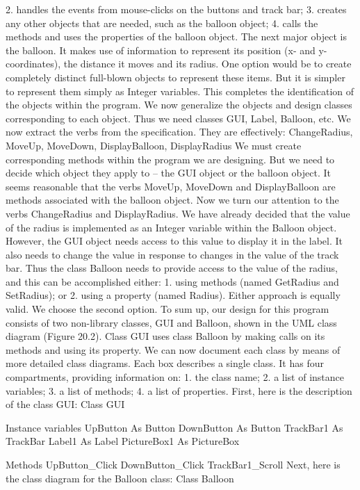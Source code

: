 2.	handles the events from mouse-clicks on the buttons and track bar;
3.	creates any other objects that are needed, such as the balloon object;
4.	calls the methods and uses the properties of the balloon object.
The next major object is the balloon. It makes use of information to represent its 
position (x- and y-coordinates), the distance it moves and its radius. One option would be to create completely distinct full-blown objects to represent these items. But it is simpler to represent them simply as Integer variables.
This completes the identiﬁcation of the objects within the program. We now generalize the objects and design classes corresponding to each object. Thus we need classes GUI, Label, Balloon, etc.
We now extract the verbs from the speciﬁcation. They are effectively:
ChangeRadius, MoveUp, MoveDown, DisplayBalloon, DisplayRadius
We must create corresponding methods within the program we are designing. But we need to decide which object they apply to – the GUI object or the balloon object. It seems reasonable that the verbs MoveUp, MoveDown and DisplayBalloon are methods associated with the balloon object.
Now we turn our attention to the verbs ChangeRadius and DisplayRadius. We have already decided that the value of the radius is implemented as an Integer variable within the Balloon object. However, the GUI object needs access to this value to display it in the label. It also needs to change the value in response to changes in the value of the track bar. Thus the class Balloon needs to provide access to the value of the radius, and this can be accomplished either:
1.	using methods (named GetRadius and SetRadius); or
2.	using a property (named Radius).
Either approach is equally valid. We choose the second option.
To sum up, our design for this program consists of two non-library classes, GUI and Balloon, shown in the UML class diagram (Figure 20.2). Class GUI uses class Balloon by making calls on its methods and using its property.
We can now document each class by means of more detailed class diagrams. Each box describes a single class. It has four compartments, providing information on:
1.	the class name;
2.	a list of instance variables;
3.	a list of methods;
4.	a list of properties.
First, here is the description of the class GUI:
Class GUI

Instance variables
UpButton As Button
DownButton As Button
TrackBar1 As TrackBar
Label1 As Label
PictureBox1 As PictureBox


Methods
UpButton_Click
DownButton_Click
TrackBar1_Scroll
Next, here is the class diagram for the Balloon class:
Class Balloon

